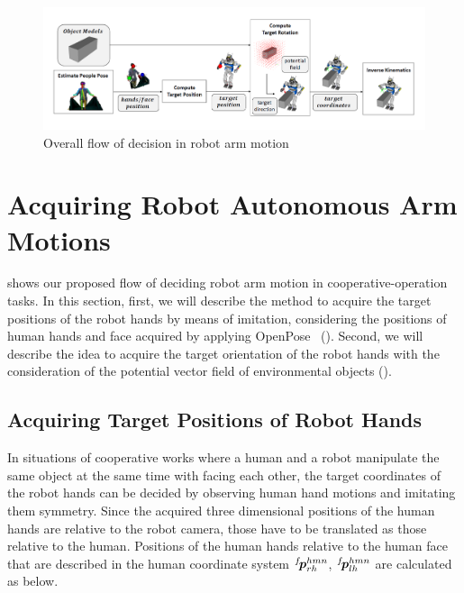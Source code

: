 \def\vector#1{\mbox{\boldmath $#1$}}

\begin{figure}[htbp]
 \begin{center}
  \includegraphics[width=1.80\columnwidth]{figs/flow_en.png}
  \vspace{-3mm}
  \caption{Overall flow of decision in robot arm motion}
  \label{figure:flow}
 \end{center}
 \vspace{-6mm}
\end{figure}

\section{Acquiring Robot Autonomous Arm Motions}
\label{sec:motion_generator}
 shows our proposed flow of deciding robot arm motion in cooperative-operation tasks. In this section, first, we will describe the method to acquire the target positions of the robot hands by means of imitation, considering the positions of human hands and face acquired by applying OpenPose~\cite{OpenPose} ().
Second, we will describe the idea to acquire the target orientation of the robot hands with the consideration of the potential vector field of environmental objects ().

\subsection{Acquiring Target Positions of Robot Hands}
\label{subsec:position}
In situations of cooperative works where a human and a robot manipulate the same object at the same time with facing each other, the target coordinates of the robot hands can be decided by observing human hand motions and imitating them symmetry. Since the acquired three dimensional positions of the human hands are relative to the robot camera, those have to be translated as those relative to the human. Positions of the human hands relative to the human face that are described in the human coordinate system \(^{f}\!\vector{p}^{hmn}_{rh}\), \(^{f}\!\vector{p}^{hmn}_{lh}\) are calculated as below.

